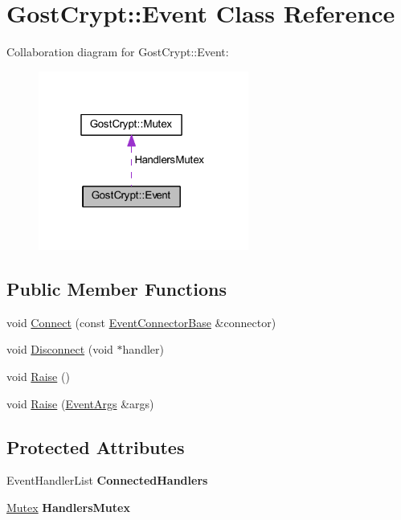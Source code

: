 \hypertarget{class_gost_crypt_1_1_event}{}\section{Gost\+Crypt\+:\+:Event Class Reference}
\label{class_gost_crypt_1_1_event}


Collaboration diagram for Gost\+Crypt\+:\+:Event\+:
\nopagebreak
\begin{figure}[H]
\begin{center}
\leavevmode
\includegraphics[width=196pt]{class_gost_crypt_1_1_event__coll__graph}
\end{center}
\end{figure}
\subsection*{Public Member Functions}
\begin{DoxyCompactItemize}
\item 
void \hyperlink{class_gost_crypt_1_1_event_afc95f658c559d0a115f6953e8ad5b65c}{Connect} (const \hyperlink{class_gost_crypt_1_1_event_connector_base}{Event\+Connector\+Base} \&connector)
\item 
void \hyperlink{class_gost_crypt_1_1_event_a37c6fd3137c478d982230a38bcc7e757}{Disconnect} (void $\ast$handler)
\item 
void \hyperlink{class_gost_crypt_1_1_event_a54998cfe707186e98972fa0ea086bd0a}{Raise} ()
\item 
void \hyperlink{class_gost_crypt_1_1_event_a142ec026100ee558e74241fb8c3b3b7f}{Raise} (\hyperlink{struct_gost_crypt_1_1_event_args}{Event\+Args} \&args)
\end{DoxyCompactItemize}
\subsection*{Protected Attributes}
\begin{DoxyCompactItemize}
\item 
\mbox{\label{class_gost_crypt_1_1_event_a406d12efe8ae5d250c0d8f518178c5d3}} 
Event\+Handler\+List {\bfseries Connected\+Handlers}
\item 
\mbox{\label{class_gost_crypt_1_1_event_aa02ddb6fcec4b9226de54ccf547f03fe}} 
\hyperlink{class_gost_crypt_1_1_mutex}{Mutex} {\bfseries Handlers\+Mutex}
\end{DoxyCompactItemize}



